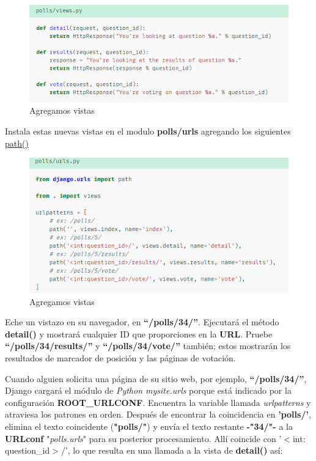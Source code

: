 \documentclass[10pt]{article}
\newcommand{\django}[1]{{\textcolor{G}{Django} #1}}
\begin{document}
\begin{figure}[H]
\begin{center}
\includegraphics[scale=1]{figuras/3/33/332/img1.png}
\caption{Agregamos vistas}
\end{center}
\end{figure}

Instala estas nuevas vistas en el modulo \textbf{polls/urls}
agregando los siguientes {\href{https://docs.djangoproject.com/en/3.0/ref/urls/\#django.urls.path}{\textcolor{B}{path()}}}

\begin{figure}[H]
\begin{center}
\includegraphics[scale=1]{figuras/3/33/332/img2.png}
\caption{Agregamos vistas}
\end{center}
\end{figure}

Eche un vistazo en su navegador, en \textbf{``/polls/34/''}. Ejecutará el método \textbf{detail()} y mostrará cualquier ID que proporciones en la \textbf{URL}. Pruebe \textbf{``/polls/34/results/''} y \textbf{``/polls/34/vote/''}  también; estos mostrarán los resultados de marcador de posición y las páginas de votación.

Cuando alguien solicita una página de su sitio web, por ejemplo, \textbf{``/polls/34/''}, \django{} cargará el módulo de \textit{Python mysite.urls} porque está indicado por la configuración \textbf{ROOT\_URLCONF}. Encuentra la variable llamada \textit{urlpatterns} y atraviesa los patrones en orden. Después de encontrar la coincidencia en \textbf{'polls/'}, elimina el texto coincidente (\textbf{"polls/"}) y envía el texto restante \textbf{-"34/"-} a la \textbf{URLconf} "\textit{polls.urls}" para su posterior procesamiento. Allí coincide con \textcolor{G}{'$<$int: question\_id$>$/'}, lo que resulta en una llamada a la vista de \textbf{detail()} así:
\end{document}
